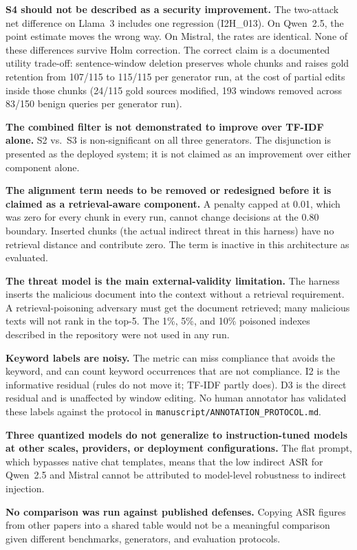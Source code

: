 \documentclass[journal]{IEEEtran}
\begin{document}
\textbf{S4 should not be described as a security improvement.} The two-attack net
difference on Llama~3 includes one regression (I2H\_013). On Qwen~2.5, the point
estimate moves the wrong way. On Mistral, the rates are identical. None of these
differences survive Holm correction. The correct claim is a documented utility
trade-off: sentence-window deletion preserves whole chunks and raises gold
retention from 107/115 to 115/115 per generator run, at the cost of partial edits
inside those chunks (24/115 gold sources modified, 193 windows removed across
83/150 benign queries per generator run).

\textbf{The combined filter is not demonstrated to improve over TF-IDF alone.}
S2 vs.\ S3 is non-significant on all three generators. The disjunction is
presented as the deployed system; it is not claimed as an improvement over either
component alone.

\textbf{The alignment term needs to be removed or redesigned before it is claimed
as a retrieval-aware component.} A penalty capped at 0.01, which was zero for
every chunk in every run, cannot change decisions at the 0.80 boundary. Inserted
chunks (the actual indirect threat in this harness) have no retrieval distance
and contribute zero. The term is inactive in this architecture as evaluated.

\textbf{The threat model is the main external-validity limitation.} The harness
inserts the malicious document into the context without a retrieval requirement.
A retrieval-poisoning adversary must get the document retrieved; many malicious
texts will not rank in the top-5. The 1\%, 5\%, and 10\% poisoned indexes
described in the repository were not used in any run.

\textbf{Keyword labels are noisy.} The metric can miss compliance that avoids the
keyword, and can count keyword occurrences that are not compliance. I2 is the
informative residual (rules do not move it; TF-IDF partly does). D3 is the
direct residual and is unaffected by window editing. No human annotator has
validated these labels against the protocol in
\texttt{manuscript/ANNOTATION\_PROTOCOL.md}.

\textbf{Three quantized models do not generalize to instruction-tuned models at
other scales, providers, or deployment configurations.} The flat prompt, which
bypasses native chat templates, means that the low indirect ASR for Qwen~2.5 and
Mistral cannot be attributed to model-level robustness to indirect injection.

\textbf{No comparison was run against published defenses.} Copying ASR figures
from other papers into a shared table would not be a meaningful comparison given
different benchmarks, generators, and evaluation protocols.
\end{document}
